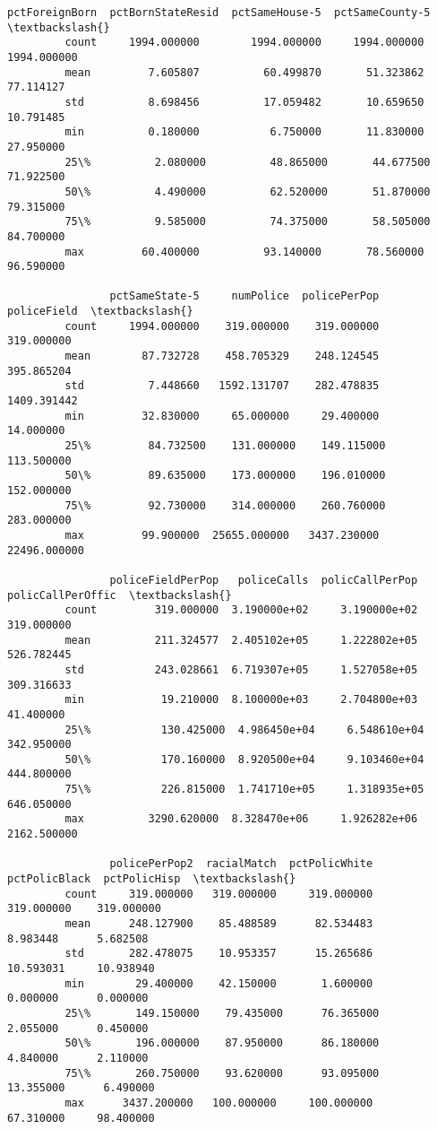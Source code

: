 \documentclass[11pt]{llncs}
\begin{document}
\begin{Verbatim}[commandchars=\\\{\}]
                pctForeignBorn  pctBornStateResid  pctSameHouse-5  pctSameCounty-5  \textbackslash{}
         count     1994.000000        1994.000000     1994.000000      1994.000000   
         mean         7.605807          60.499870       51.323862        77.114127   
         std          8.698456          17.059482       10.659650        10.791485   
         min          0.180000           6.750000       11.830000        27.950000   
         25\%          2.080000          48.865000       44.677500        71.922500   
         50\%          4.490000          62.520000       51.870000        79.315000   
         75\%          9.585000          74.375000       58.505000        84.700000   
         max         60.400000          93.140000       78.560000        96.590000   
         
                pctSameState-5     numPolice  policePerPop   policeField  \textbackslash{}
         count     1994.000000    319.000000    319.000000    319.000000   
         mean        87.732728    458.705329    248.124545    395.865204   
         std          7.448660   1592.131707    282.478835   1409.391442   
         min         32.830000     65.000000     29.400000     14.000000   
         25\%         84.732500    131.000000    149.115000    113.500000   
         50\%         89.635000    173.000000    196.010000    152.000000   
         75\%         92.730000    314.000000    260.760000    283.000000   
         max         99.900000  25655.000000   3437.230000  22496.000000   
         
                policeFieldPerPop   policeCalls  policCallPerPop  policCallPerOffic  \textbackslash{}
         count         319.000000  3.190000e+02     3.190000e+02         319.000000   
         mean          211.324577  2.405102e+05     1.222802e+05         526.782445   
         std           243.028661  6.719307e+05     1.527058e+05         309.316633   
         min            19.210000  8.100000e+03     2.704800e+03          41.400000   
         25\%           130.425000  4.986450e+04     6.548610e+04         342.950000   
         50\%           170.160000  8.920500e+04     9.103460e+04         444.800000   
         75\%           226.815000  1.741710e+05     1.318935e+05         646.050000   
         max          3290.620000  8.328470e+06     1.926282e+06        2162.500000   
         
                policePerPop2  racialMatch  pctPolicWhite  pctPolicBlack  pctPolicHisp  \textbackslash{}
         count     319.000000   319.000000     319.000000     319.000000    319.000000   
         mean      248.127900    85.488589      82.534483       8.983448      5.682508   
         std       282.478075    10.953357      15.265686      10.593031     10.938940   
         min        29.400000    42.150000       1.600000       0.000000      0.000000   
         25\%       149.150000    79.435000      76.365000       2.055000      0.450000   
         50\%       196.000000    87.950000      86.180000       4.840000      2.110000   
         75\%       260.750000    93.620000      93.095000      13.355000      6.490000   
         max      3437.200000   100.000000     100.000000      67.310000     98.400000   
         

\end{Verbatim}
\end{document}
